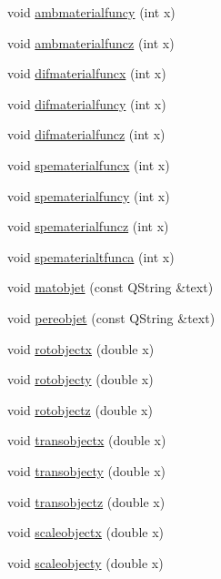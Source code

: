 \begin{DoxyCompactItemize}
void \hyperlink{class_mondock_abab8b7116db8f4d8a45f97bbccfea28a}{ambmaterialfuncy} (int x)
\item 
void \hyperlink{class_mondock_aef75cf8b1bb4a9cf7e6f6a04ac9a6e53}{ambmaterialfuncz} (int x)
\item 
void \hyperlink{class_mondock_ab52fa4e602f9dd7686b4beaee1ae78a7}{difmaterialfuncx} (int x)
\item 
void \hyperlink{class_mondock_acb6ef6ce35644055c6782614193c0abf}{difmaterialfuncy} (int x)
\item 
void \hyperlink{class_mondock_a8ff74685d0e326198673395786ca80d4}{difmaterialfuncz} (int x)
\item 
void \hyperlink{class_mondock_ad62497d70cea045864c6f6dfa63f0a4c}{spematerialfuncx} (int x)
\item 
void \hyperlink{class_mondock_ada51acb02b3cb5d32e3982e93e2b2951}{spematerialfuncy} (int x)
\item 
void \hyperlink{class_mondock_aebe3927b8d0b1c6a703580cf69284405}{spematerialfuncz} (int x)
\item 
void \hyperlink{class_mondock_acfe377696276e313ee29188412cdefc5}{spematerialtfunca} (int x)
\item 
void \hyperlink{class_mondock_ae7cba6de97474c812bf5f6e1f5372540}{matobjet} (const Q\+String \&text)
\item 
void \hyperlink{class_mondock_afcb87fab11d89a1a24da091153d4dbac}{pereobjet} (const Q\+String \&text)
\item 
void \hyperlink{class_mondock_a7543dea413bcfc6c79847373e99f75fc}{rotobjectx} (double x)
\item 
void \hyperlink{class_mondock_ad182d69edf7f245ade47b574813357d0}{rotobjecty} (double x)
\item 
void \hyperlink{class_mondock_a90dd35e5da95e3b29a44104f8527605b}{rotobjectz} (double x)
\item 
void \hyperlink{class_mondock_a68ab5d84182366c7231014333055d12d}{transobjectx} (double x)
\item 
void \hyperlink{class_mondock_ac6fba22518497d0b8ed04c976dd98ef3}{transobjecty} (double x)
\item 
void \hyperlink{class_mondock_a4577b03f35f3e2eaa7d1826b1a9f0ebe}{transobjectz} (double x)
\item 
void \hyperlink{class_mondock_a6978ac0641ff991c971ddbb571a8e8fd}{scaleobjectx} (double x)
\item 
void \hyperlink{class_mondock_a5d96ddec02aefd94fe519bcb9d973e4f}{scaleobjecty} (double x)
\item 

\end{DoxyCompactItemize}
